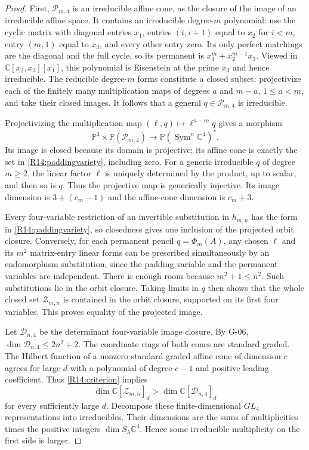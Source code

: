 \documentclass[11pt,a4paper]{article}
\theoremstyle{definition}\newtheorem{definition}{Definition}
\begin{document}
\begin{proof}
First, $\mathcal P_{m,4}$ is an irreducible affine cone, as the
closure of the image of an irreducible affine space. It contains
an irreducible degree-$m$ polynomial: use the cyclic matrix with
diagonal entries $x_1$, entries $(i,i+1)$ equal to $x_2$ for
$i<m$, entry $(m,1)$ equal to $x_3$, and every other entry zero.
Its only perfect matchings are the diagonal and the full cycle,
so its permanent is $x_1^m+x_2^{m-1}x_3$.
Viewed in $\mathbb C[x_2,x_3][x_1]$, this polynomial is
Eisenstein at the prime $x_3$ and hence irreducible.
The reducible degree-$m$ forms constitute a closed subset:
projectivize each of the finitely many multiplication maps of
degrees $a$ and $m-a$, $1\leq a<m$, and take their closed images.
It follows that a general $q\in\mathcal P_{m,4}$ is irreducible.

Projectivizing the multiplication map
$(\ell,q)\mapsto\ell^{n-m}q$ gives a morphism
\[
 \mathbb P^3\times\mathbb P(\mathcal P_{m,4})
 \longrightarrow\mathbb P(\operatorname{Sym}^n\mathbb C^4)^*.
\]
Its image is closed because its domain is projective; its affine
cone is exactly the set in \eqref{R14:paddingvariety}, including
zero. For a generic irreducible $q$ of degree $m\geq2$, the
linear factor $\ell$ is uniquely determined by the product,
up to scalar, and then so is $q$. Thus the projective map is
generically injective. Its image dimension is
$3+(c_m-1)$ and the affine-cone dimension is $c_m+3$.

Every four-variable restriction of an invertible substitution
in $h_{m,n}$ has the form in \eqref{R14:paddingvariety}, so
closedness gives one inclusion of the projected orbit closure.
Conversely, for each permanent pencil $q=\Phi_m(A)$, any chosen
$\ell$ and its $m^2$ matrix-entry linear forms can be prescribed
simultaneously by an endomorphism substitution, since the
padding variable and the permanent variables are independent.
There is enough room because $m^2+1\leq n^2$.
Such substitutions lie in the orbit closure. Taking limits in
$q$ then shows that the whole closed set $\mathcal Z_{m,n}$ is
contained in the orbit closure, supported on its first four
variables. This proves equality of the projected image.

Let $\mathcal D_{n,4}$ be the determinant four-variable image
closure. By G-06, $\dim\mathcal D_{n,4}\leq2n^2+2$.
The coordinate rings of both cones are standard graded. The
Hilbert function of a nonzero standard graded affine cone of
dimension $c$ agrees for large $d$ with a polynomial of degree
$c-1$ and positive leading coefficient. Thus
\eqref{R14:criterion} implies
\[
 \dim\mathbb C[\mathcal Z_{m,n}]_d
 >\dim\mathbb C[\mathcal D_{n,4}]_d
\]
for every sufficiently large $d$.
Decompose these finite-dimensional $GL_4$ representations into
irreducibles. Their dimensions are the sums of multiplicities
times the positive integers $\dim S_\lambda\mathbb C^4$.
Hence some irreducible multiplicity on the first side is larger.


\end{proof}
\end{document}
